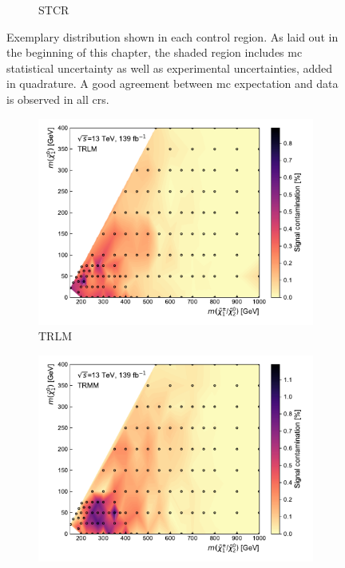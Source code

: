 \begin{figure}
\begin{subfigure}[b]{0.5\linewidth}
		\caption{STCR\label{fig:signal_contaminations_STCR}}
	\end{subfigure}\hfill

	\caption{Exemplary distribution shown in each control region. As laid out in the beginning of this chapter, the shaded region includes \gls{mc} statistical uncertainty as well as experimental uncertainties, added in quadrature. A good agreement between \gls{mc} expectation and data is observed in all \glspl{cr}.}
	\label{fig:CR_distributions_prefit}
\end{figure}

 \begin{figure}
	\centering
	\begin{subfigure}[b]{0.5\linewidth}
		\centering\includegraphics[width=1.0\textwidth]{signal_contamination/plot_TRLM}
		\caption{TRLM\label{fig:signal_contamination_TRLM}}
	\end{subfigure}\hfill
	\begin{subfigure}[b]{0.5\linewidth}
		\centering\includegraphics[width=1.0\textwidth]{signal_contamination/plot_TRMM}

\end{subfigure}
\end{figure}
